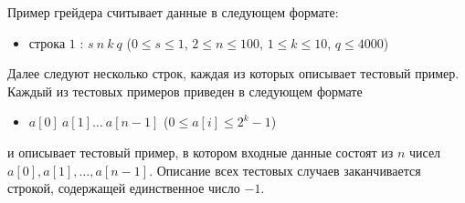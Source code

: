 Пример грейдера считывает данные в следующем формате:
\begin{itemize}
\item строка $1$ : $s\ n\ k\ q$ ($0 \leq s \leq 1$, $2 \leq n \leq 100$, $1 \leq k \leq 10$, $q \leq 4000$)
\end{itemize}

Далее следуют несколько строк, каждая из которых описывает тестовый пример.
Каждый из тестовых примеров приведен в следующем формате
\begin{itemize}
\item $a[0]\ a[1]\ldots \ a[n - 1]$ ($0 \leq a[i] \leq 2^k-1$)
\end{itemize}

и описывает тестовый пример, в котором входные данные состоят из $n$ чисел $a[0], a[1],\ldots, a[n-1]$.
Описание всех тестовых случаев заканчивается строкой, содержащей единственное число $-1$.

